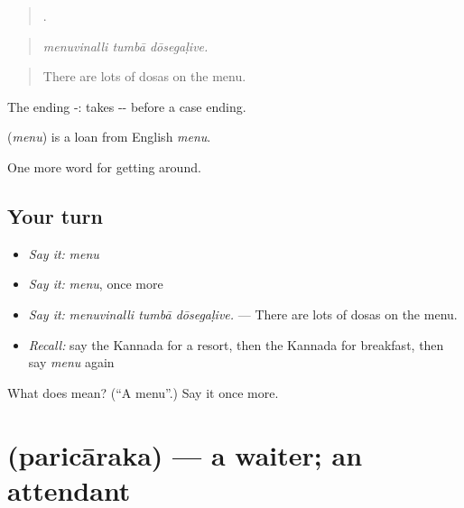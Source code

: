 \begin{quote}
  .
\end{quote}

\begin{quote}
\emph{menuvinalli tumbā dōsegaḷive.}
\end{quote}

\begin{quote}
There are lots of dosas on the menu.
\end{quote}

The ending -:  takes -- before a case ending.

\begin{cousinweb}
\textbf{} (\emph{menu}) is a loan from English \emph{menu}.
\end{cousinweb}

\begin{grammarlens}[title={What you've built}]
One more word for getting around.
\end{grammarlens}

\subsection*{Your turn}
\begin{itemize}
\raggedright
  \item \emph{Say it:} \emph{menu}
  \item \emph{Say it:} \emph{menu}, once more
  \item \emph{Say it:} \emph{menuvinalli tumbā dōsegaḷive.} — There are lots of dosas on the menu.
  \item \emph{Recall:} say the Kannada for a resort, then the Kannada for breakfast, then say \emph{menu} again
\end{itemize}

\begin{tcolorbox}[breakable,colback=teal!4,colframe=teal!35!black,title={Before you move on}]
What does  mean? (\textquotedblleft{}A menu\textquotedblright{}.) Say it once more.
\end{tcolorbox}
\section[\texorpdfstring{\kn{ಪರಿಚಾರಕ} (paricāraka)}{ಪರಿಚಾರಕ (paricāraka)}]{ (paricāraka) — a waiter; an attendant}

\label{lesson:KA-C464-paricaraka}



